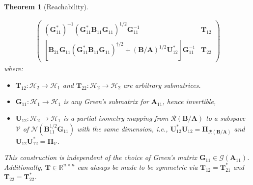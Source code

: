 \documentclass[noinfoline]{imsart}\setcounter{tocdepth}{2}
\renewcommand{\b}[1]{\mathbb{#1}} %
\newcommand{\m}[1]{\mathbf{#1}} %
\renewcommand{\c}[1]{\mathcal{#1}} %
\theoremstyle{plain}
\newtheorem{theorem}{Theorem}[section]
\begin{document}
\begin{theorem}[Reachability]
\begin{enumerate}[leftmargin = *]
\begin{align*}
\begin{pmatrix}
    (\m{G}_{11}^{*})^{-1} (\m{G}_{11}^{*} \m{B}_{11} \m{G}_{11})^{1/2} \m{G}_{11}^{-1} & \m{T}_{12} \\
    [\m{B}_{21} \m{G}_{11} (\m{G}_{11}^{*} \m{B}_{11} \m{G}_{11})^{\dagger/2} + (\m{B}/\m{A})^{1/2} \m{U}_{12}^{*}] \m{G}_{11}^{-1} & \m{T}_{22}
    \end{pmatrix} 
\end{align*}
where: 
\begin{itemize}[leftmargin = *]
    \item $\m{T}_{12} : \c{H}_{2} \to \c{H}_{1}$ and $\m{T}_{22} : \c{H}_{2} \to \c{H}_{2}$ are arbitrary submatrices.
    \item $\m{G}_{11} : \c{H}_{1} \to \c{H}_{1}$ is any Green's submatrix for $\m{A}_{11}$, hence invertible,
    \item $\m{U}_{12} : \c{H}_{2} \to \c{H}_{1}$ is a partial isometry mapping from $\c{R}(\m{B}/\m{A})$ to a subspace $\c{V}$ of $\c{N}(\m{B}_{11}^{1/2} \m{G}_{11})$ with the same dimension, i.e., $\m{U}_{12}^{*} \m{U}_{12} = \m{\Pi}_{\c{R}(\m{B}/\m{A})}$ and $\m{U}_{12} \m{U}_{12}^{*} = \m{\Pi}_{\c{V}}$.
\end{itemize}
This construction is independent of the choice of Green's matrix $\m{G}_{11} \in \c{G}(\m{A}_{11})$. Additionally, $\m{T} \in \b{R}^{n \times n}$ can always be made to be symmetric via $\m{T}_{12} = \m{T}_{21}^{*}$ and $\m{T}_{22} = \m{T}_{22}^{*}$.
\end{enumerate}
\end{theorem}
\end{document}
